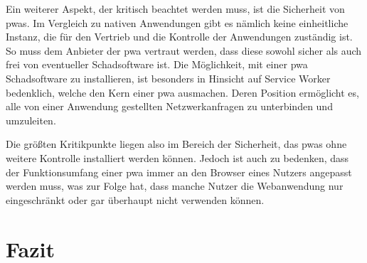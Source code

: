 \documentclass[12pt, parskip=half]{scrartcl}       %
\begin{document}
Ein weiterer Aspekt, der kritisch beachtet werden muss, ist die Sicherheit von \acp{pwa}.
Im Vergleich zu nativen Anwendungen gibt es nämlich keine einheitliche Instanz, die für den Vertrieb und die Kontrolle der Anwendungen zuständig ist.
So muss dem Anbieter der \ac{pwa} vertraut werden, dass diese sowohl sicher als auch frei von eventueller Schadsoftware ist.
Die Möglichkeit, mit einer \ac{pwa} Schadsoftware zu installieren, ist besonders in Hinsicht auf Service Worker bedenklich, welche den Kern einer \ac{pwa} ausmachen.
Deren Position ermöglicht es, alle von einer Anwendung gestellten Netzwerkanfragen zu unterbinden und umzuleiten.

Die größten Kritikpunkte liegen also im Bereich der Sicherheit, das \acp{pwa} ohne weitere Kontrolle installiert werden können.
Jedoch ist auch zu bedenken, dass der Funktionsumfang einer \ac{pwa} immer an den Browser eines Nutzers angepasst werden muss, was zur Folge hat, dass manche Nutzer die Webanwendung nur eingeschränkt oder gar überhaupt nicht verwenden können.

\section{Fazit}



\newpage


\printbibliography
\end{document}
